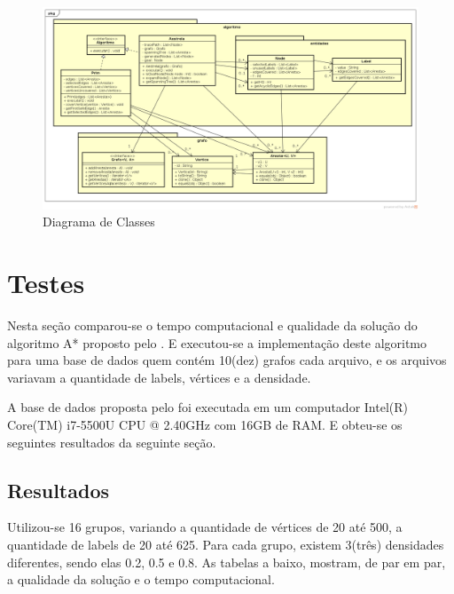 \documentclass[12pt]{article}
\begin{document}
		\begin{landscape}
		\centering
		\begin{figure}[p]
		\includegraphics[width=1.4\textwidth]{ClassDiagram.png}
		\caption{Diagrama de Classes}
		\label{fig:classDiagram}
		\end{figure}
		\end{landscape}
		\restoregeometry

\section{Testes}\label{sec:testes}

	Nesta seção comparou-se o tempo computacional e qualidade da solução do algoritmo A* proposto pelo \cite{chang:1996}. E executou-se a implementação deste algoritmo para uma base de dados quem contém 10(dez) grafos cada arquivo, e os arquivos variavam a quantidade de labels, vértices e a densidade.

	A base de dados proposta pelo \cite{consoli:2009} foi executada em um computador Intel(R) Core(TM) i7-5500U CPU @ 2.40GHz com 16GB de RAM. E obteu-se os seguintes resultados da seguinte seção.

	\subsection{Resultados}\label{sec:resultados}
		
		Utilizou-se 16 grupos, variando a quantidade de vértices de 20 até 500, a quantidade de labels de 20 até 625. Para cada grupo, existem 3(três) densidades diferentes, sendo elas 0.2, 0.5 e 0.8. As tabelas a baixo, mostram, de par em par, a qualidade da solução e o tempo computacional.
\end{document}
